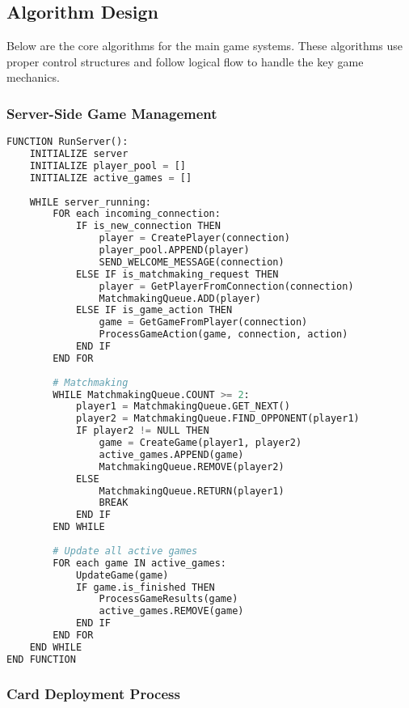 \documentclass{article}
\begin{document}
\subsection{Algorithm Design}

Below are the core algorithms for the main game systems. These algorithms use proper control structures and follow logical flow to handle the key game mechanics.

\subsubsection{Server-Side Game Management}

\begin{lstlisting}[language=Python, caption=Main Server Loop]
FUNCTION RunServer():
    INITIALIZE server
    INITIALIZE player_pool = []
    INITIALIZE active_games = []
    
    WHILE server_running:
        FOR each incoming_connection:
            IF is_new_connection THEN
                player = CreatePlayer(connection)
                player_pool.APPEND(player)
                SEND_WELCOME_MESSAGE(connection)
            ELSE IF is_matchmaking_request THEN
                player = GetPlayerFromConnection(connection)
                MatchmakingQueue.ADD(player)
            ELSE IF is_game_action THEN
                game = GetGameFromPlayer(connection)
                ProcessGameAction(game, connection, action)
            END IF
        END FOR
        
        # Matchmaking
        WHILE MatchmakingQueue.COUNT >= 2:
            player1 = MatchmakingQueue.GET_NEXT()
            player2 = MatchmakingQueue.FIND_OPPONENT(player1)
            IF player2 != NULL THEN
                game = CreateGame(player1, player2)
                active_games.APPEND(game)
                MatchmakingQueue.REMOVE(player2)
            ELSE
                MatchmakingQueue.RETURN(player1)
                BREAK
            END IF
        END WHILE
        
        # Update all active games
        FOR each game IN active_games:
            UpdateGame(game)
            IF game.is_finished THEN
                ProcessGameResults(game)
                active_games.REMOVE(game)
            END IF
        END FOR
    END WHILE
END FUNCTION
\end{lstlisting}

\subsubsection{Card Deployment Process}
\end{document}
